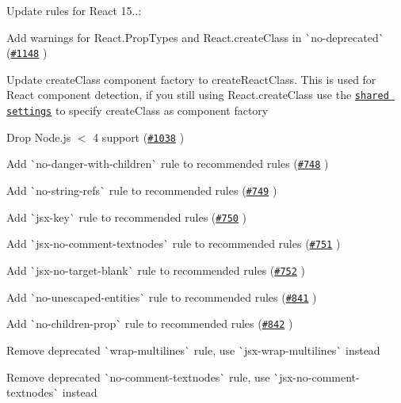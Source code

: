 \begin{DoxyItemize}
\item Update rules for React 15..\+:
\begin{DoxyItemize}
\item Add warnings for {\ttfamily React.\+Prop\+Types} and {\ttfamily React.\+create\+Class} in \`{}no-\/deprecated\`{} (\href{https://github.com/yannickcr/eslint-plugin-react/pull/1148}{\tt \#1148} )
\item Update {\ttfamily create\+Class} component factory to {\ttfamily create\+React\+Class}. This is used for React component detection, if you still using {\ttfamily React.\+create\+Class} use the \href{README.md#configuration}{\tt shared settings} to specify {\ttfamily create\+Class} as component factory
\end{DoxyItemize}
\item Drop Node.\+js $<$ 4 support (\href{https://github.com/yannickcr/eslint-plugin-react/pull/1038}{\tt \#1038} )
\item Add \`{}no-\/danger-\/with-\/children\`{} rule to recommended rules (\href{https://github.com/yannickcr/eslint-plugin-react/issues/748}{\tt \#748} )
\item Add \`{}no-\/string-\/refs\`{} rule to recommended rules (\href{https://github.com/yannickcr/eslint-plugin-react/issues/749}{\tt \#749} )
\item Add \`{}jsx-\/key\`{} rule to recommended rules (\href{https://github.com/yannickcr/eslint-plugin-react/issues/750}{\tt \#750} )
\item Add \`{}jsx-\/no-\/comment-\/textnodes\`{} rule to recommended rules (\href{https://github.com/yannickcr/eslint-plugin-react/issues/751}{\tt \#751} )
\item Add \`{}jsx-\/no-\/target-\/blank\`{} rule to recommended rules (\href{https://github.com/yannickcr/eslint-plugin-react/issues/752}{\tt \#752} )
\item Add \`{}no-\/unescaped-\/entities\`{} rule to recommended rules (\href{https://github.com/yannickcr/eslint-plugin-react/issues/841}{\tt \#841} )
\item Add \`{}no-\/children-\/prop\`{} rule to recommended rules (\href{https://github.com/yannickcr/eslint-plugin-react/issues/842}{\tt \#842} )
\item Remove deprecated \`{}wrap-\/multilines\`{} rule, use \`{}jsx-\/wrap-\/multilines\`{} instead
\item Remove deprecated \`{}no-\/comment-\/textnodes\`{} rule, use \`{}jsx-\/no-\/comment-\/textnodes\`{} instead

\end{DoxyItemize}
